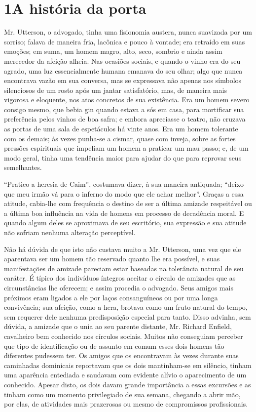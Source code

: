 
\chapter[1 -- A história da porta]{1\break A história da porta}

Mr. Utterson, o advogado, tinha uma fisionomia austera, nunca suavizada
por um sorriso; falava de maneira fria, lacônica e pouco à vontade; era
retraído em suas emoções; em suma, um homem magro, alto, seco, sombrio
e ainda assim merecedor da afeição alheia.  Nas ocasiões sociais, e
quando o vinho era do seu agrado, uma luz essencialmente humana emanava
do seu olhar; algo que nunca encontrava vazão em sua conversa, mas se
expressava não apenas nos símbolos silenciosos de um rosto após um
jantar satisfatório, mas, de maneira mais vigorosa e eloquente, nos
atos concretos de sua existência.  Era um homem severo consigo mesmo,
que bebia gin quando estava a sós em casa, para mortificar sua
preferência pelos vinhos de boa safra; e embora apreciasse o teatro,
não cruzava as portas de uma sala de espetáculos há vinte anos.  Era um
homem tolerante com os demais; às vezes punha-se a cismar, quase com
inveja, sobre as fortes pressões espirituais que impeliam um homem a
praticar um mau passo; e, de um modo geral, tinha uma tendência maior
para ajudar do que para reprovar seus semelhantes.

“Pratico a heresia de Caim”, costumava dizer, à sua maneira antiquada;
“deixo que meu irmão vá para o inferno do modo que ele achar melhor”. 
Graças a essa atitude, cabia-lhe com frequência o destino de ser a
última amizade respeitável ou a última boa influência na vida de homens
em processo de decadência moral.  E quando algum deles se aproximava de
seu escritório, sua expressão e sua atitude não sofriam nenhuma
alteração perceptível.

Não há dúvida de que isto não custava muito a Mr. Utterson, uma vez que
ele aparentava ser um homem tão reservado quanto lhe era possível, e
suas manifestações de amizade pareciam estar baseadas na tolerância
natural de seu caráter.  É típico dos indivíduos íntegros aceitar o
círculo de amizades que as circunstâncias lhe oferecem; e assim
procedia o advogado.  Seus amigos mais próximos eram ligados a ele por
laços consanguíneos ou por uma longa convivência; sua afeição, como a
hera, brotava como um fruto natural do tempo, sem requerer dele nenhuma
predisposição especial para tanto.  Disso advinha, sem dúvida, a
amizade que o unia ao seu parente distante, Mr. Richard Enfield,
cavalheiro bem conhecido nos círculos sociais.  Muitos não conseguiam
perceber que tipo de identificação ou de assunto em comum esses dois
homens tão diferentes pudessem ter.  Os amigos que os encontravam às
vezes durante suas caminhadas dominicais reportavam que os dois
mantinham-se em silêncio, tinham uma aparência entediada e saudavam com
evidente alívio o aparecimento de um conhecido.  Apesar disto, os dois
davam grande importância a essas excursões e as tinham como um momento
privilegiado de sua semana, chegando a abrir mão, por elas, de
atividades mais prazerosas ou mesmo de compromissos profissionais.

